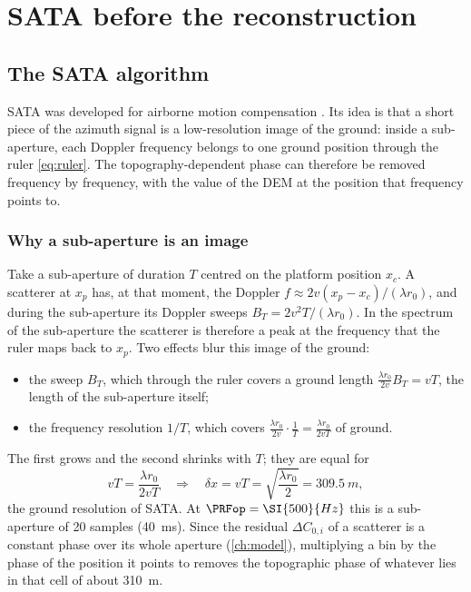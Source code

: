 \chapter{SATA before the reconstruction}\label{ch:sata}

\section{The SATA algorithm}\label{sec:sata-algo}

SATA was developed for airborne motion compensation \cite{Prats2005topo,Prats2005thesis}. Its idea is that a short piece
of the azimuth signal is a low-resolution image of the ground: inside a sub-aperture, each Doppler frequency belongs to one
ground position through the ruler \eqref{eq:ruler}. The topography-dependent phase can therefore be removed frequency by
frequency, with the value of the DEM at the position that frequency points to.

\subsection{Why a sub-aperture is an image}

Take a sub-aperture of duration $T$ centred on the platform position $x_c$. A scatterer at $x_p$ has, at that moment, the
Doppler $f\approx 2v(x_p-x_c)/(\lambda r_0)$, and during the sub-aperture its Doppler sweeps
$B_T=2v^2T/(\lambda r_0)$. In the spectrum of the sub-aperture the scatterer is therefore a peak at the frequency that the
ruler maps back to $x_p$. Two effects blur this image of the ground:
\begin{itemize}
  \item the sweep $B_T$, which through the ruler covers a ground length $\frac{\lambda r_0}{2v}B_T=vT$, the length of the
        sub-aperture itself;
  \item the frequency resolution $1/T$, which covers $\frac{\lambda r_0}{2v}\cdot\frac1T=\frac{\lambda r_0}{2vT}$ of ground.
\end{itemize}
The first grows and the second shrinks with $T$; they are equal for
\begin{equation}
  vT=\frac{\lambda r_0}{2vT}
  \quad\Longrightarrow\quad
  \delta x=vT=\sqrt{\frac{\lambda r_0}{2}}=\SI{309.5}{m},
  \label{eq:satares}
\end{equation}
the ground resolution of SATA. At $\PRFop=\SI{500}{Hz}$ this is a sub-aperture of 20 samples (\SI{40}{ms}). Since the
residual $\Delta C_{0,i}$ of a scatterer is a constant phase over its whole aperture (\cref{ch:model}), multiplying a bin by
the phase of the position it points to removes the topographic phase of whatever lies in that cell of about \SI{310}{m}.

